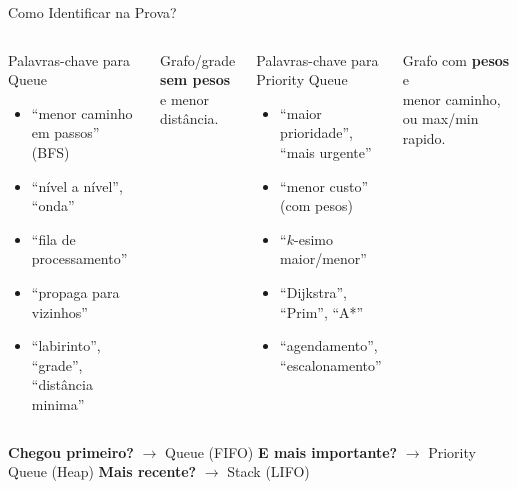 \documentclass[aspectratio=169,10pt]{beamer}
\begin{document}
\begin{frame}{Como Identificar na Prova?}
  \begin{columns}[t]
      \begin{block}{Palavras-chave para Queue}
        \begin{itemize}\footnotesize
          \item ``menor caminho em passos'' (BFS)
          \item ``nível a nível'', ``onda''
          \item ``fila de processamento''
          \item ``propaga para vizinhos''
          \item ``labirinto'', ``grade'', ``distância minima''
        \end{itemize}
      \end{block}
      \vspace{0.1cm}
      \begin{tcolorbox}[caixaLaranja,title={Sinal: use Queue}]
        \footnotesize
        Grafo/grade \textbf{sem pesos}\\e menor distância.
      \end{tcolorbox}
      \begin{block}{Palavras-chave para Priority Queue}
        \begin{itemize}\footnotesize
          \item ``maior prioridade'', ``mais urgente''
          \item ``menor custo'' (com pesos)
          \item ``$k$-esimo maior/menor''
          \item ``Dijkstra'', ``Prim'', ``A*''
          \item ``agendamento'', ``escalonamento''
        \end{itemize}
      \end{block}
      \vspace{0.1cm}
      \begin{tcolorbox}[caixaRoxa,title={Sinal: use Priority Queue}]
        \footnotesize
        Grafo com \textbf{pesos} e\\menor caminho, ou max/min rapido.
      \end{tcolorbox}
  \end{columns}
  \vspace{0.1cm}
  \begin{tcolorbox}[caixaAmarelo,title={Pergunta magica}]
    \footnotesize
    \textbf{Chegou primeiro?} $\to$ Queue (FIFO)\quad
    \textbf{E mais importante?} $\to$ Priority Queue (Heap)\quad
    \textbf{Mais recente?} $\to$ Stack (LIFO)
  \end{tcolorbox}
\end{frame}
\end{document}
